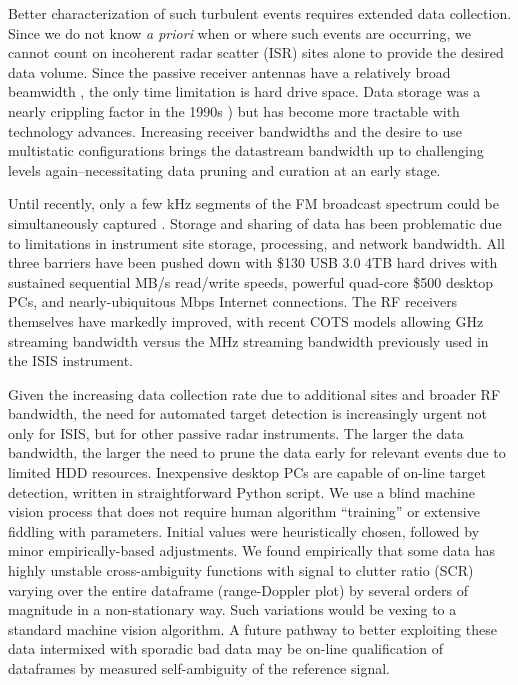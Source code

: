 Better characterization of such turbulent events requires extended data collection. Since we do not know \textit{a priori} when or where such events are occurring, we cannot count on incoherent radar scatter (ISR) sites alone to provide the desired data volume. 
Since the passive receiver antennas have a relatively broad beamwidth \citep{lind2013}, the only time limitation is hard drive space.
Data storage was a nearly crippling factor in the 1990s \citep{sahr1997}) but has become more tractable with technology advances. 
Increasing receiver bandwidths and the desire to use multistatic configurations brings the datastream bandwidth up to challenging levels again--necessitating data pruning and curation at an early stage. 

Until recently, only a few \unit[150]{kHz} segments of the FM broadcast spectrum could be simultaneously captured \citep{lind2013}. 
Storage and sharing of data has been problematic due to limitations in instrument site storage, processing, and network bandwidth.  
All three barriers have been pushed down with \$130 USB 3.0 4TB hard drives with sustained sequential \unit[100]{MB/s} read/write speeds, powerful quad-core \$500 desktop PCs, and nearly-ubiquitous \unit[50]{Mbps} Internet connections. 
The RF receivers themselves have markedly improved, with recent COTS models allowing \unit[1]{GHz} streaming bandwidth \citep{lind2015} versus the \unit[2]{MHz} streaming bandwidth previously used in the ISIS instrument.

Given the increasing data collection rate due to additional sites and broader RF bandwidth, the need for automated target detection is increasingly urgent not only for ISIS, but for other passive radar instruments. 
The larger the data bandwidth, the larger the need to prune the data early for relevant events due to limited HDD resources. 
Inexpensive desktop PCs are capable of on-line target detection, written in straightforward Python script. 
We use a blind machine vision process that does not require human algorithm “training” or extensive fiddling with parameters. 
Initial values were heuristically chosen, followed by minor empirically-based adjustments. 
We found empirically that some data has highly unstable cross-ambiguity functions with signal to clutter ratio (SCR) varying over the entire dataframe (range-Doppler plot) by several orders of magnitude in a non-stationary way. 
Such variations would be vexing to a standard machine vision algorithm. 
A future pathway to better exploiting these data intermixed with sporadic bad data may be on-line qualification of dataframes by measured self-ambiguity of the reference signal.


